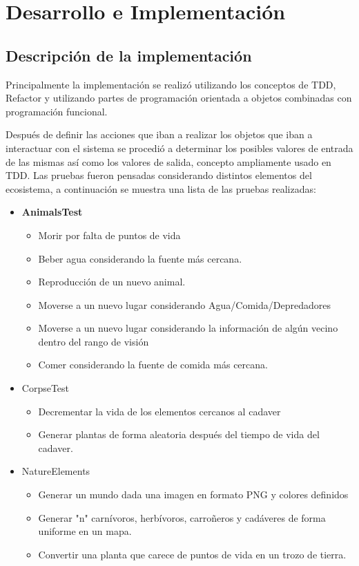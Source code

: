 \section{Desarrollo e Implementación}
  \subsection{Descripción de la implementación}    
    Principalmente la implementación se realizó utilizando los conceptos de TDD, Refactor y utilizando partes de programación orientada a objetos combinadas con programación funcional.

    Después de definir las acciones que iban a realizar los objetos que iban a interactuar con el sistema se procedió a determinar los posibles valores de entrada de las mismas así como los valores de salida, concepto ampliamente usado en TDD. Las pruebas fueron pensadas considerando distintos elementos del ecosistema, a continuación se muestra una lista de las pruebas realizadas:

      \begin{itemize}
        \item{\textbf{AnimalsTest}}
          \begin{itemize}
            \item{Morir por falta de puntos de vida}
            \item{Beber agua considerando la fuente más cercana.}
            \item{Reproducción de un nuevo animal.}
            \item{Moverse a un nuevo lugar considerando Agua/Comida/Depredadores}
            \item{Moverse a un nuevo lugar considerando la información de algún vecino dentro del rango de visión}
            \item{Comer considerando la fuente de comida más cercana.}
          \end{itemize}
        \item{CorpseTest}
          \begin{itemize}
            \item{Decrementar la vida de los elementos cercanos al cadaver}            
            \item{Generar plantas de forma aleatoria después del tiempo de vida del cadaver.}
          \end{itemize}
        \item{NatureElements}
          \begin{itemize}
            \item{Generar un mundo dada una imagen en formato PNG y colores definidos}
            \item{Generar "n" carnívoros, herbívoros, carroñeros y cadáveres de forma uniforme en un mapa.}
            \item{Convertir una planta que carece de puntos de vida en un trozo de tierra.}
          \end{itemize}
      \end{itemize}      
    
